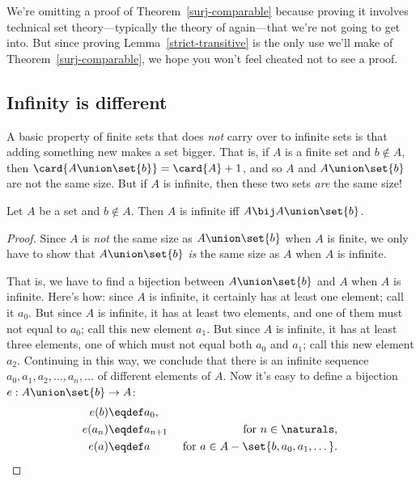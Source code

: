We're omitting a proof of Theorem~\ref{surj-comparable} because
proving it involves technical set theory---typically the theory of
 again---that we're not going to get into.  But since
proving Lemma~\ref{strict-transitive} is the only use we'll make of
Theorem~\ref{surj-comparable}, we hope you won't feel cheated not to
see a proof.

\subsection{Infinity is different}

A basic property of finite sets that does \emph{not} carry over to
infinite sets is that adding something new makes a set bigger.  That
is, if $A$ is a finite set and $b \notin A$, then $\card{A \union
  \set{b}} = \card{A}+1$, and so $A$ and $A \union \set{b}$ are not
the same size.  But if $A$ is infinite, then these two sets \emph{are}
the same size!

\begin{lemma}\label{AUb}
  Let $A$ be a set and $b \notin A$.  Then $A$ is infinite iff $A \bij
  A \union \set{b}$.
\end{lemma}
\begin{proof}
  Since $A$ is \emph{not} the same size as $A \union \set{b}$ when $A$
  is finite, we only have to show that $A \union \set{b}$ \emph{is}
  the same size as $A$ when $A$ is infinite.

That is, we have to find a bijection between $A \union \set{b}$ and
$A$ when $A$ is infinite.  Here's how: since $A$ is infinite, it
certainly has at least one element; call it $a_0$.  But since $A$ is
infinite, it has at least two elements, and one of them must not equal
to $a_0$; call this new element $a_1$.  But since $A$ is infinite, it
has at least three elements, one of which must not equal both $a_0$
and $a_1$; call this new element $a_2$.  Continuing in this way, we
conclude that there is an infinite sequence
$a_0,a_1,a_2,\dots,a_n,\dots$ of different elements of $A$.  Now it's
easy to define a bijection $e: A \union \set{b} \to A$:
\begin{align*}
e(b) & \eqdef a_0,\\
e(a_n) & \eqdef a_{n+1}
          & \text{ for } n \in \naturals,\\
e(a) & \eqdef a
          & \text{ for } a \in A - \set{b,a_0,a_1,\dots}.
\end{align*}
\end{proof}

